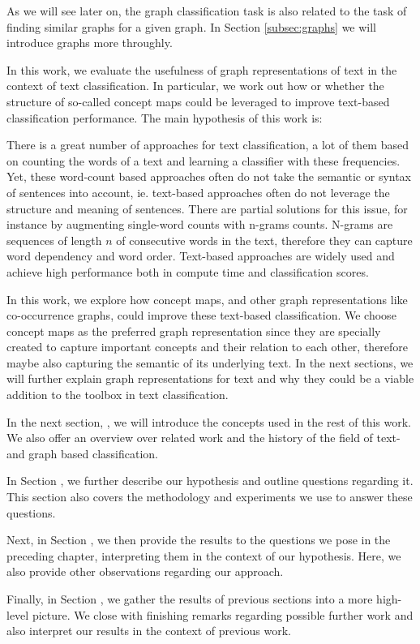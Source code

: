 As we will see later on, the graph classification task is also related to the task of finding similar graphs for a given graph.
In Section \ref{subsec:graphs} we will introduce graphs more throughly.

In this work, we evaluate the usefulness of graph representations of text in the context of text classification. In particular, we work out how or whether the structure of so-called concept maps could be leveraged  to improve text-based classification performance.
The main hypothesis of this work is:
\begin{quote}
\hypothesis
\end{quote}

There is a great number of approaches for text classification, a lot of them based on counting the words of a text and learning a classifier with these frequencies.
Yet, these word-count based approaches often do not take the semantic or syntax of sentences into account, ie. text-based approaches often do not leverage the structure and meaning of sentences.
There are partial solutions for this issue, for instance by augmenting single-word counts with n-grams counts.
N-grams are sequences of length $n$ of consecutive words in the text, therefore they can capture word dependency and word order.
Text-based approaches are widely used and achieve high performance both in compute time and classification scores.

In this work, we explore how concept maps, and other graph representations like co-occurrence graphs, could improve these text-based classification.
We choose concept maps as the preferred graph representation since they are specially created to capture important concepts and their relation to each other, therefore maybe also capturing the semantic of its underlying text.
In the next sections, we will further explain graph representations for text and why they could be a viable addition to the toolbox in text classification.

In the next section, , we will introduce the concepts used in the rest of this work.
We also offer an overview over related work and the history of the field of text- and graph based classification.

In Section , we further describe our hypothesis and outline questions regarding it. This section also covers the methodology and experiments we use to answer these questions.

Next, in Section , we then provide the results to the questions we pose in the preceding chapter, interpreting them in the context of our hypothesis.
Here, we also provide other observations regarding our approach.

Finally, in Section , we gather the results of previous sections into a more high-level picture.
We close with finishing remarks regarding possible further work and also interpret our results in the context of previous work.